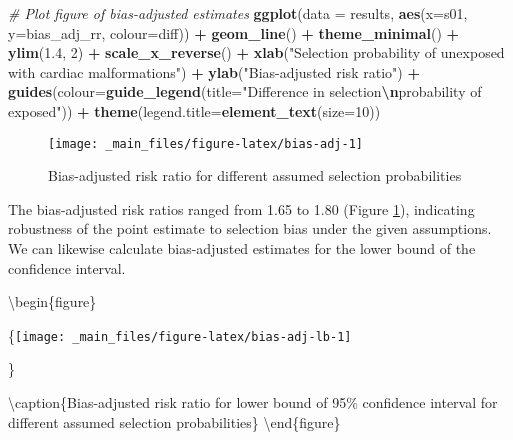 \documentclass[
]{book}
\newenvironment{Shaded}{\begin{snugshade}}{\end{snugshade}}
\newcommand{\AttributeTok}[1]{\textcolor[rgb]{0.13,0.29,0.53}{#1}}
\newcommand{\CommentTok}[1]{\textcolor[rgb]{0.56,0.35,0.01}{\textit{#1}}}
\newcommand{\DecValTok}[1]{\textcolor[rgb]{0.00,0.00,0.81}{#1}}
\newcommand{\FloatTok}[1]{\textcolor[rgb]{0.00,0.00,0.81}{#1}}
\newcommand{\FunctionTok}[1]{\textcolor[rgb]{0.13,0.29,0.53}{\textbf{#1}}}
\newcommand{\NormalTok}[1]{#1}
\newcommand{\SpecialCharTok}[1]{\textcolor[rgb]{0.81,0.36,0.00}{\textbf{#1}}}
\newcommand{\StringTok}[1]{\textcolor[rgb]{0.31,0.60,0.02}{#1}}
\begin{document}
\begin{Shaded}
\begin{Highlighting}[]
\CommentTok{\# Plot figure of bias{-}adjusted estimates}
\FunctionTok{ggplot}\NormalTok{(}\AttributeTok{data =}\NormalTok{ results, }\FunctionTok{aes}\NormalTok{(}\AttributeTok{x=}\NormalTok{s01, }\AttributeTok{y=}\NormalTok{bias\_adj\_rr, }\AttributeTok{colour=}\NormalTok{diff)) }\SpecialCharTok{+} 
  \FunctionTok{geom\_line}\NormalTok{() }\SpecialCharTok{+} 
  \FunctionTok{theme\_minimal}\NormalTok{() }\SpecialCharTok{+}
  \FunctionTok{ylim}\NormalTok{(}\FloatTok{1.4}\NormalTok{, }\DecValTok{2}\NormalTok{) }\SpecialCharTok{+} 
  \FunctionTok{scale\_x\_reverse}\NormalTok{() }\SpecialCharTok{+}
  \FunctionTok{xlab}\NormalTok{(}\StringTok{"Selection probability of unexposed with cardiac malformations"}\NormalTok{) }\SpecialCharTok{+} 
  \FunctionTok{ylab}\NormalTok{(}\StringTok{"Bias{-}adjusted risk ratio"}\NormalTok{) }\SpecialCharTok{+}
  \FunctionTok{guides}\NormalTok{(}\AttributeTok{colour=}\FunctionTok{guide\_legend}\NormalTok{(}\AttributeTok{title=}\StringTok{"Difference in selection}\SpecialCharTok{\textbackslash{}n}\StringTok{probability of exposed"}\NormalTok{)) }\SpecialCharTok{+}
  \FunctionTok{theme}\NormalTok{(}\AttributeTok{legend.title=}\FunctionTok{element\_text}\NormalTok{(}\AttributeTok{size=}\DecValTok{10}\NormalTok{))}
\end{Highlighting}
\end{Shaded}

\begin{figure}

{\centering \texttt{[image: \_main\_files/figure-latex/bias-adj-1]} 

}

\caption{Bias-adjusted risk ratio for different assumed selection probabilities}\label{fig:bias-adj}
\end{figure}

The bias-adjusted risk ratios ranged from 1.65 to 1.80 (Figure \ref{fig:bias-adj}), indicating robustness of the point estimate to selection bias under the given assumptions. We can likewise calculate bias-adjusted estimates for the lower bound of the confidence interval.

\textbackslash begin\{figure\}

\{\centering \texttt{[image: \_main\_files/figure-latex/bias-adj-lb-1]}

\}

\textbackslash caption\{Bias-adjusted risk ratio for lower bound of 95\% confidence interval for different assumed selection probabilities\}\label{fig:bias-adj-lb}
\textbackslash end\{figure\}
\end{document}
